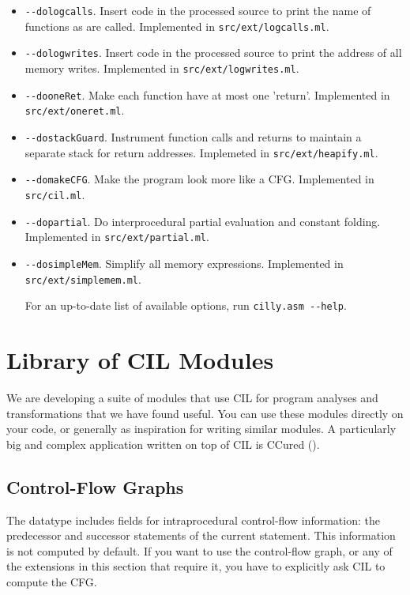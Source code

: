\documentclass{article}
\def\secref#1{Section~\ref{sec-#1}}
\def\apiref#1#2#3{\ahref{api/#1.html\##2#3}{#1.#3}}
\def\ciltyperef#1{\apiref{Cil}{TYPE}{#1}}
\def\t#1{{\tt #1}}
\begin{document}
\begin{itemize}
  {\bf Selected features.}  See \secref{Extension} for more information.
\item \t{-{}-dologcalls}. Insert code in the processed source to print the name of
functions as are called. Implemented in \t{src/ext/logcalls.ml}.
\item \t{-{}-dologwrites}. Insert code in the processed source to print the
address of all memory writes. Implemented in \t{src/ext/logwrites.ml}.
\item \t{-{}-dooneRet}. Make each function have at most one 'return'.
Implemented in \t{src/ext/oneret.ml}. 
\item \t{-{}-dostackGuard}. Instrument function calls and returns to
maintain a separate stack for return addresses. Implemeted in
\t{src/ext/heapify.ml}. 
\item \t{-{}-domakeCFG}. Make the program look more like a CFG. Implemented
in \t{src/cil.ml}. 
\item \t{-{}-dopartial}. Do interprocedural partial evaluation and
constant folding. Implemented in \t{src/ext/partial.ml}. 
\item \t{-{}-dosimpleMem}. Simplify all memory expressions. Implemented in
\t{src/ext/simplemem.ml}. 

For an up-to-date list of available options, run \t{cilly.asm -{}-help}. 

\end{itemize}

\section{Library of CIL Modules} \label{sec-Extension}

 We are developing a suite of modules that use CIL for program analyses and
transformations that we have found useful. You can use these modules directly
on your code, or generally as inspiration for writing similar modules. A
particularly big and complex application written on top of CIL is CCured
().

\subsection{Control-Flow Graphs} \label{sec-cfg}

The \ciltyperef{stmt} datatype includes fields for intraprocedural
control-flow information: the predecessor and successor statements of
the current statement.  This information is not computed by default.
If you want to use the control-flow graph, or any of the extensions in
this section that require it, you have to explicitly ask CIL to
compute the CFG.
\end{document}
